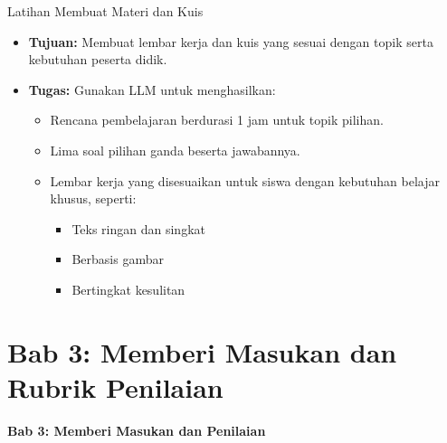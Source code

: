 \documentclass[aspectratio=169, table]{beamer}
\begin{document}
\begin{frame}[fragile]{Latihan Membuat Materi dan Kuis}
	\vspace{20pt}
	\small
	\begin{itemize}
		\item \textbf{Tujuan:} Membuat lembar kerja dan kuis yang sesuai dengan topik serta kebutuhan peserta didik.
		
		\item \textbf{Tugas:} Gunakan LLM untuk menghasilkan:
		\begin{itemize}
			\item Rencana pembelajaran berdurasi 1 jam untuk topik pilihan.
			\item Lima soal pilihan ganda beserta jawabannya.
			\item Lembar kerja yang disesuaikan untuk siswa dengan kebutuhan belajar khusus, seperti:
			\begin{itemize}
				\item Teks ringan dan singkat
				\item Berbasis gambar
				\item Bertingkat kesulitan
			\end{itemize}
		\end{itemize}
	\end{itemize}
\end{frame}

\section{Bab 3: Memberi Masukan dan Rubrik Penilaian}
\begin{frame}{\hfill}
	\centering
	\Huge{\textbf{Bab 3: Memberi Masukan dan Penilaian}}
\end{frame}
\end{document}
